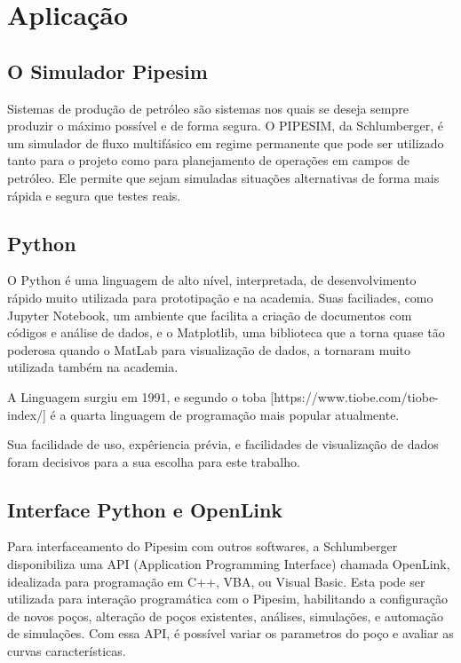 
\chapter{Aplicação} \label{chap:4}


\section{O Simulador Pipesim}
Sistemas de produção de petróleo são sistemas nos quais se deseja sempre produzir o máximo possível e de forma segura.
O PIPESIM, da Schlumberger, é um simulador de fluxo multifásico em regime permanente que pode ser utilizado tanto para o projeto como para planejamento de operações em campos de petróleo. Ele permite que sejam simuladas situações alternativas de forma mais rápida e segura que testes reais.

\section{Python}

O Python é uma linguagem de alto nível, interpretada, de desenvolvimento rápido muito utilizada para prototipação e na academia. Suas faciliades, como Jupyter Notebook, um ambiente que facilita a criação de documentos com códigos e análise de dados, e o Matplotlib, uma biblioteca que a torna quase tão poderosa quando o MatLab para visualização de dados, a tornaram muito utilizada também na academia.

A Linguagem surgiu em 1991, e segundo o toba [https://www.tiobe.com/tiobe-index/] é a quarta linguagem de programação mais popular atualmente.

Sua facilidade de uso, expêriencia prévia, e facilidades de visualização de dados foram decisivos para a sua escolha para este trabalho. 

\section{Interface Python e OpenLink}
Para interfaceamento do Pipesim com outros softwares, a Schlumberger disponibiliza uma API (Application Programming Interface) chamada OpenLink, idealizada para programação em C++, VBA, ou Visual Basic. Esta pode ser utilizada para interação programática com o Pipesim, habilitando a configuração de novos poços, alteração de poços existentes, análises, simulações, e automação de simulações. Com essa API, é possível variar os parametros do poço e avaliar as curvas características.

